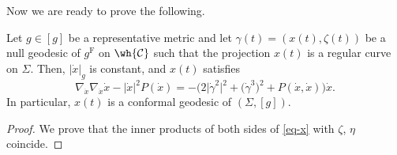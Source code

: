 Now we are ready to prove the following.

\begin{Theorem}\label{null-geod-proj}
Let $g\in[g]$ be a representative metric and let $\gamma(t)=(x(t), \zeta(t))$ be a null geodesic of $g^{\mathrm{F}}$ on $\wh{\mathcal{C}}$ such that the projection $x(t)$ is a regular curve on $\Sigma$. Then, $|\dot x|_g$ is constant, and $x(t)$ satisfies
\begin{equation}\label{eq-x}
\nabla_{\dot x}\nabla_{\dot x}\dot x-|\dot x|^2P(\dot x)=
-\bigl(2\bigl|\dot\gamma^2\bigr|^2+\bigl(\dot\gamma^3\bigr)^2+P(\dot x, \dot x)\bigr)\dot x.
\end{equation}
In particular, $x(t)$ is a conformal geodesic of $(\Sigma, [g])$.
\end{Theorem}
\begin{proof}
We prove that the inner products of both sides of \eqref{eq-x} with $\zeta$, $\eta$ coincide.


\end{proof}
